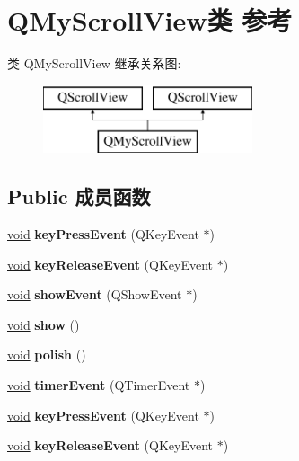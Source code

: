 \hypertarget{class_q_my_scroll_view}{}\section{Q\+My\+Scroll\+View类 参考}
\label{class_q_my_scroll_view}
类 Q\+My\+Scroll\+View 继承关系图\+:\begin{figure}[H]
\begin{center}
\leavevmode
\includegraphics[height=2.000000cm]{class_q_my_scroll_view}
\end{center}
\end{figure}
\subsection*{Public 成员函数}
\begin{DoxyCompactItemize}
\item 
\mbox{\label{class_q_my_scroll_view_a1e4ab116ce57143e0848d1791cb7acb8}} 
\hyperlink{interfacevoid}{void} {\bfseries key\+Press\+Event} (Q\+Key\+Event $\ast$)
\item 
\mbox{\label{class_q_my_scroll_view_ad86da6a61e9fa761c87acbc17527da80}} 
\hyperlink{interfacevoid}{void} {\bfseries key\+Release\+Event} (Q\+Key\+Event $\ast$)
\item 
\mbox{\label{class_q_my_scroll_view_a8c50cb31d0fb7d9b7eafb1e86d8b36d6}} 
\hyperlink{interfacevoid}{void} {\bfseries show\+Event} (Q\+Show\+Event $\ast$)
\item 
\mbox{\label{class_q_my_scroll_view_a89e5ad981c7b54cbd4a1f61b6cfd04e1}} 
\hyperlink{interfacevoid}{void} {\bfseries show} ()
\item 
\mbox{\label{class_q_my_scroll_view_a6150afcbd11a4c33ab14636aea57f612}} 
\hyperlink{interfacevoid}{void} {\bfseries polish} ()
\item 
\mbox{\label{class_q_my_scroll_view_ad18608fff3a7c8c7cbff2af07a7df5f1}} 
\hyperlink{interfacevoid}{void} {\bfseries timer\+Event} (Q\+Timer\+Event $\ast$)
\item 
\mbox{\label{class_q_my_scroll_view_a1e4ab116ce57143e0848d1791cb7acb8}} 
\hyperlink{interfacevoid}{void} {\bfseries key\+Press\+Event} (Q\+Key\+Event $\ast$)
\item 
\mbox{\label{class_q_my_scroll_view_ad86da6a61e9fa761c87acbc17527da80}} 
\hyperlink{interfacevoid}{void} {\bfseries key\+Release\+Event} (Q\+Key\+Event $\ast$)
\end{DoxyCompactItemize}
